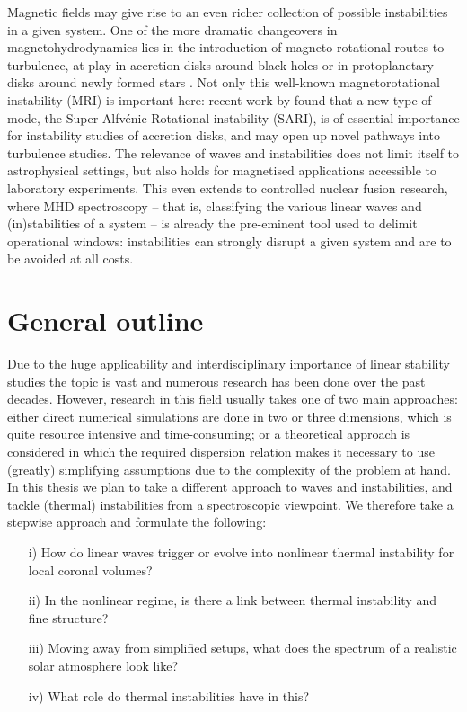Magnetic fields may give rise to an even richer collection of possible instabilities in a given system. One of the more dramatic changeovers in magnetohydrodynamics lies in the introduction of magneto-rotational routes to turbulence, at play in accretion disks around black holes or in protoplanetary disks around newly formed stars \citep{balbus1991}. Not only this well-known magnetorotational instability (MRI) is important here: recent work by \citet{goedbloed2022_sari} found that a new type of mode, the Super-Alfv\'enic Rotational instability (SARI), is of essential importance for instability studies of accretion disks, and may open up novel pathways into turbulence studies.
The relevance of waves and instabilities does not limit itself to astrophysical settings, but also holds for magnetised applications accessible to laboratory experiments. This even extends to controlled nuclear fusion research, where MHD spectroscopy -- that is, classifying the various linear waves and (in)stabilities of a system -- is already the pre-eminent tool used to delimit operational windows: instabilities can strongly disrupt a given system and are to be avoided at all costs.


\section{General outline}
Due to the huge applicability and interdisciplinary importance of linear stability studies the topic is vast and numerous research has been done over the past decades. However, research in this field usually takes one of two main approaches: either direct numerical simulations are done in two or three dimensions, which is quite resource intensive and time-consuming; or a theoretical approach is considered in which the required dispersion relation makes it necessary to use (greatly) simplifying assumptions due to the complexity of the problem at hand. In this thesis we plan to take a different approach to waves and instabilities, and tackle (thermal) instabilities from a spectroscopic viewpoint. We therefore take a stepwise approach and formulate the following:
\begin{enumerate}
  \item[i)] How do linear waves trigger or evolve into nonlinear thermal instability for local coronal volumes?
  \item[ii)] In the nonlinear regime, is there a link between thermal instability and fine structure?
  \item[iii)] Moving away from simplified setups, what does the spectrum of a realistic solar atmosphere look like?
  \item[iv)] What role do thermal instabilities have in this?
\end{enumerate}

